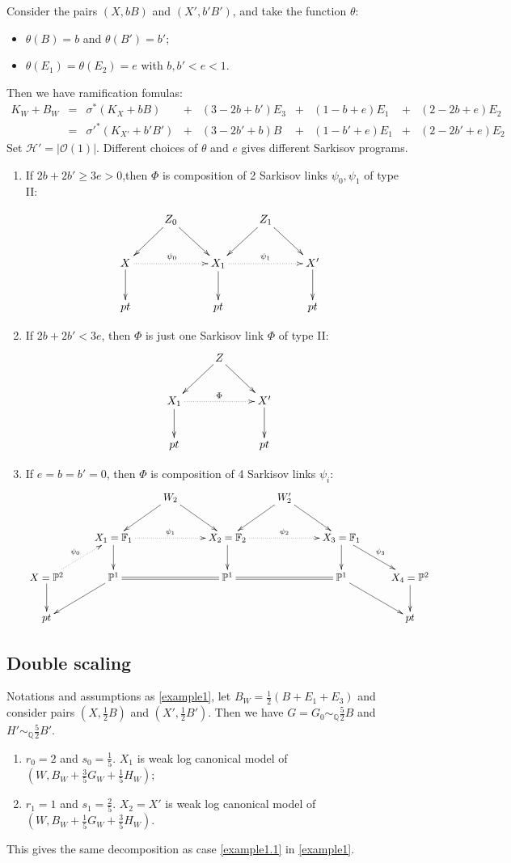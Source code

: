 \documentclass[11pt]{amsart}
\numberwithin{equation}{section}
\begin{document}
Consider the pairs $ (X,bB) $ and $ (X',b'B') $, and take the function $\theta$:
\begin{itemize}
  \item $\theta(B)=b$ and $\theta(B')=b'$;
  \item $\theta(E_{1})=\theta(E_{2})=e$ with $b,b'<e<1$. 
\end{itemize}
Then we have ramification fomulas:
\[ \begin{array}{rllllllllll}
  K_W+B_W&=&\sigma^*(K_X+bB)&+& (3-2b+b')E_3&+&(1-b+e)E_1&+&(2-2b+e)E_2&\\
  &=&\sigma'^*(K_{X'}+b'B')&+&(3-2b'+b)B&+&(1-b'+e)E_1&+&(2-2b'+e)E_2&
\end{array} \]
Set $ \mathcal{H}'=|\mathcal{O}(1)| $. Different choices of $\theta$ and  $e$ gives different Sarkisov programs. 
\begin{enumerate}
  \item\label{example1.1} If $ 2b+2b'\geqslant 3e>0 $,then $\Phi$ is composition of 2 Sarkisov links $\psi_{0},\psi_{1}$ of type II:

    \[
      \xymatrix{
    &Z_{0}\ar[rd]\ar[ld] & &Z_{1}\ar[rd]\ar[ld]\\
        X\ar[d]\ar@{.>}[rr]^{\psi_{0}}& &X_{1}\ar@{.>}[rr]^{\psi_{1}}\ar[d]&&X'\ar[d]\\
        pt&&pt&&pt
      }
    \]
  \item If $ 2b+2b'< 3e $, then $\Phi$ is just one Sarkisov link $\Phi$ of type II:
    \[
      \xymatrix{
    &Z\ar[rd]\ar[ld] & \\
        X_{1}\ar@{.>}[rr]^{\Phi}\ar[d]& &X'\ar[d]\\
        pt&&pt
      }
    \]
  \item If $ e=b=b'=0 $, then $\Phi$ is composition of 4 Sarkisov links $\psi_{i}$:
\[ \xymatrix{
&&W_2\ar[ld]\ar[rd]&&W_2'\ar[ld]\ar[rd]\\
&X_1=\mathbb{F}_1\ar@{.>}[rr]^{\psi_{1}}\ar[d]&&X_2=\mathbb{F}_2\ar@{.>}[rr]^{\psi_{2}}\ar[d]&&X_3=\mathbb{F}_1\ar[d]\ar[rd]^{\psi_{3}}\\
X=\mathbb{P}^2\ar[d]\ar@{.>}[ru]^{\psi_{0}}&\mathbb{P}^1\ar[ld]\ar@{=}[rr]&&\mathbb{P}^1\ar@{=}[rr]&&\mathbb{P}^1\ar[rd]&X_4=\mathbb{P}^2\ar[d]\\
pt&&&&&&pt} \]
\end{enumerate}
\subsection{Double scaling}
Notations and assumptions as \ref{example1}, let $B_{W}=\frac{1}{2}(B+E_{1}+E_{3})$ and consider pairs $(X,\frac{1}{2}B)$ and $(X',\frac{1}{2}B')$. Then we have $G=G_{0}\sim_{\mathbb{Q}}\frac{5}{2}B$ and $H'\sim_{\mathbb{Q}}\frac{5}{2}B'$.
\begin{enumerate}
  \item $r_{0}=2$ and $s_{0}=\frac{1}{5}$. $X_{1}$ is weak log canonical model of $(W,B_{W}+\frac{3}{5}G_{W}+\frac{1}{5}H_{W})$;
  \item  $r_{1}=1$ and $s_{1}=\frac{2}{5}$. $X_{2}= X'$ is weak log canonical model of $(W,B_{W}+\frac{1}{5}G_{W}+\frac{3}{5}H_{W})$.
\end{enumerate} 
This gives the same decomposition as case \ref{example1.1} in  \ref{example1}.
\end{document}
